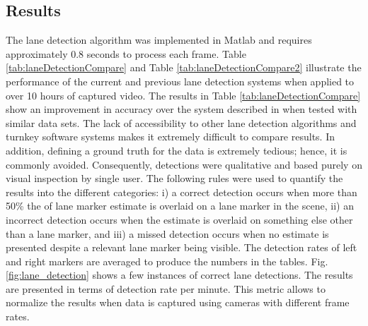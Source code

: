 \documentclass{article}
\begin{document}
\subsection{Results}
The lane detection algorithm was implemented in Matlab and requires
approximately 0.8 seconds to process each frame.
Table \ref{tab:laneDetectionCompare} and Table \ref{tab:laneDetectionCompare2} illustrate the performance of the current and previous lane detection systems when applied to over 10 hours of captured video. The results in Table \ref{tab:laneDetectionCompare} show an improvement in accuracy over the system described in \cite{borkar_layered_2009} when tested with similar data sets. The lack of accessibility to other lane detection algorithms and turnkey software systems makes it extremely difficult to compare results.
In addition, defining a ground truth for the data is extremely tedious; hence, it is commonly avoided. Consequently, detections were qualitative and based purely on visual inspection by single user. The following rules were used to quantify the results into the different categories: i) a correct detection occurs when more than 50\% the of lane marker estimate is overlaid on a lane marker in the scene, ii) an incorrect detection occurs when the estimate is overlaid on something else other than a lane marker, and iii) a missed detection occurs when no estimate is presented despite a relevant lane marker being visible. The detection rates of left and right markers are averaged to produce the numbers in the tables. Fig. \ref{fig:lane_detection} shows a few instances of correct lane detections. The results are presented in terms of detection rate per minute. This metric allows to normalize the results when data is captured using cameras with different frame rates.
\begin{table}[htb!]
\centering
\caption{Accuracy of the current lane detection system}
\label{tab:laneDetectionCompare}
\end{table}\\
\end{document}
